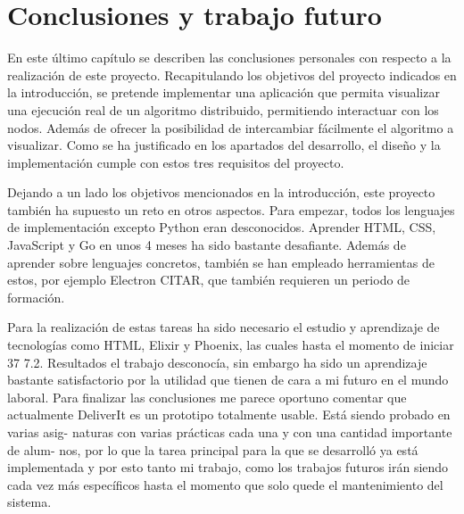 \chapter{Conclusiones y trabajo futuro}

En este último capítulo se describen las conclusiones personales con respecto a la realización de este proyecto. Recapitulando los objetivos del proyecto indicados en la introducción, se pretende implementar una aplicación que permita visualizar una ejecución real de un algoritmo distribuido, permitiendo interactuar con los nodos. Además de ofrecer la posibilidad de intercambiar fácilmente el algoritmo a visualizar. Como se ha justificado en los apartados del desarrollo, el diseño y la implementación cumple con estos tres requisitos del proyecto.

Dejando a un lado los objetivos mencionados en la introducción, este proyecto también ha supuesto un reto en otros aspectos. Para empezar, todos los lenguajes de implementación excepto Python eran desconocidos. Aprender HTML, CSS, JavaScript y Go en unos 4 meses ha sido bastante desafiante. Además de aprender sobre lenguajes concretos, también se han empleado herramientas de estos, por ejemplo Electron CITAR, que también requieren un periodo de formación.



Para la realización de estas tareas ha sido necesario el estudio y aprendizaje de
tecnologías como HTML, Elixir y Phoenix, las cuales hasta el momento de iniciar
37
7.2. Resultados
el trabajo desconocía, sin embargo ha sido un aprendizaje bastante satisfactorio
por la utilidad que tienen de cara a mi futuro en el mundo laboral.
Para finalizar las conclusiones me parece oportuno comentar que actualmente
DeliverIt es un prototipo totalmente usable. Está siendo probado en varias asig-
naturas con varias prácticas cada una y con una cantidad importante de alum-
nos, por lo que la tarea principal para la que se desarrolló ya está implementada
y por esto tanto mi trabajo, como los trabajos futuros irán siendo cada vez más
específicos hasta el momento que solo quede el mantenimiento del sistema.